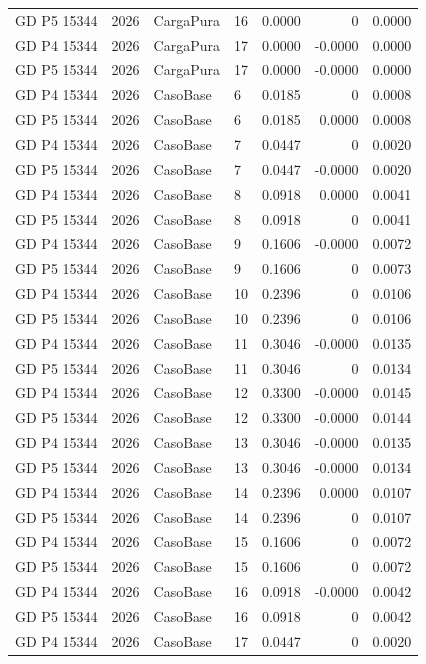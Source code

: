 \documentclass[11pt,a4paper]{article}
\begin{document}
\begin{longtable}{llllrrr}
GD P5 15344 & 2026 & CargaPura & 16 & 0.0000 & 0 & 0.0000 \\
GD P4 15344 & 2026 & CargaPura & 17 & 0.0000 & -0.0000 & 0.0000 \\
GD P5 15344 & 2026 & CargaPura & 17 & 0.0000 & -0.0000 & 0.0000 \\
GD P4 15344 & 2026 & CasoBase & 6 & 0.0185 & 0 & 0.0008 \\
GD P5 15344 & 2026 & CasoBase & 6 & 0.0185 & 0.0000 & 0.0008 \\
GD P4 15344 & 2026 & CasoBase & 7 & 0.0447 & 0 & 0.0020 \\
GD P5 15344 & 2026 & CasoBase & 7 & 0.0447 & -0.0000 & 0.0020 \\
GD P4 15344 & 2026 & CasoBase & 8 & 0.0918 & 0.0000 & 0.0041 \\
GD P5 15344 & 2026 & CasoBase & 8 & 0.0918 & 0 & 0.0041 \\
GD P4 15344 & 2026 & CasoBase & 9 & 0.1606 & -0.0000 & 0.0072 \\
GD P5 15344 & 2026 & CasoBase & 9 & 0.1606 & 0 & 0.0073 \\
GD P4 15344 & 2026 & CasoBase & 10 & 0.2396 & 0 & 0.0106 \\
GD P5 15344 & 2026 & CasoBase & 10 & 0.2396 & 0 & 0.0106 \\
GD P4 15344 & 2026 & CasoBase & 11 & 0.3046 & -0.0000 & 0.0135 \\
GD P5 15344 & 2026 & CasoBase & 11 & 0.3046 & 0 & 0.0134 \\
GD P4 15344 & 2026 & CasoBase & 12 & 0.3300 & -0.0000 & 0.0145 \\
GD P5 15344 & 2026 & CasoBase & 12 & 0.3300 & -0.0000 & 0.0144 \\
GD P4 15344 & 2026 & CasoBase & 13 & 0.3046 & -0.0000 & 0.0135 \\
GD P5 15344 & 2026 & CasoBase & 13 & 0.3046 & -0.0000 & 0.0134 \\
GD P4 15344 & 2026 & CasoBase & 14 & 0.2396 & 0.0000 & 0.0107 \\
GD P5 15344 & 2026 & CasoBase & 14 & 0.2396 & 0 & 0.0107 \\
GD P4 15344 & 2026 & CasoBase & 15 & 0.1606 & 0 & 0.0072 \\
GD P5 15344 & 2026 & CasoBase & 15 & 0.1606 & 0 & 0.0072 \\
GD P4 15344 & 2026 & CasoBase & 16 & 0.0918 & -0.0000 & 0.0042 \\
GD P5 15344 & 2026 & CasoBase & 16 & 0.0918 & 0 & 0.0042 \\
GD P4 15344 & 2026 & CasoBase & 17 & 0.0447 & 0 & 0.0020 \\

\end{longtable}
\end{document}

